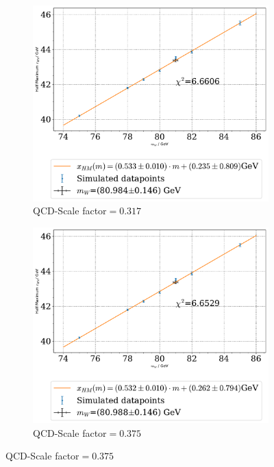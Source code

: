 \documentclass[11pt,a4paper,notitlepage]{scrartcl}
\begin{document}
\begin{figure}[H]\ContinuedFloat
	\centering
	\begin{subfigure}{0.49\linewidth}
		\includegraphics[width=\linewidth]{P1_pics/gauge_results/gauge_qcd_std_ll.pdf}
		\caption{QCD-Scale factor$=0.317$}
	\end{subfigure}
	\begin{subfigure}{0.49\linewidth}
		\includegraphics[width=\linewidth]{P1_pics/gauge_results/gauge_qcd_std_ul.pdf}
		\caption{QCD-Scale factor$=0.375$}
	\end{subfigure}

\end{figure}
\end{document}
